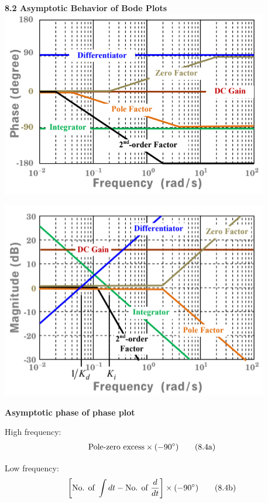 \documentclass[landscape,a4paper]{extarticle}
\newenvironment{Figure}
  {\noindent\minipage{\linewidth}}
  {\endminipage\par\medskip}
\begin{document}
\begin{multicols*}{5}
    \textbf{8.2 Asymptotic Behavior of Bode Plots}
    \begin{Figure}
        \centering
        \includegraphics[width=\linewidth]{bode1.png}        
    \end{Figure}
    \begin{Figure}
        \centering
        \includegraphics[width=\linewidth]{bode2.png}        
    \end{Figure}

    \textbf{Asymptotic phase of phase plot}

    High frequency:
    \begin{align*}
        \text{Pole-zero excess} \times (-90 \degree) \tag{8.4a}
    \end{align*}

    Low frequency:
    \begin{align*}
        \left[\text{No. of }\int dt - \text{No. of } \frac{d}{dt}\right] \times (-90 \degree) \tag{8.4b}
    \end{align*}


\end{multicols*}
\end{document}
